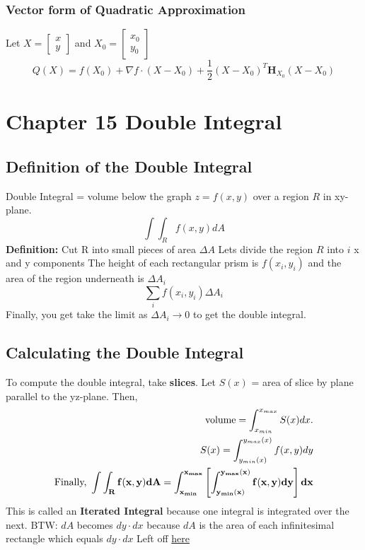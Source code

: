 \documentclass[12pt]{article}
\theoremstyle{break}
\numberwithin{theorem}{subsection}
\numberwithin{lemma}{subsection}
\numberwithin{corollary}{subsection}
\numberwithin{equation}{subsection}
\newcommand{\vect}[1]{\boldsymbol{#1}}
\begin{document}
\subsubsection{Vector form of Quadratic Approximation}
Let $X = \begin{bmatrix} x \\ y \end{bmatrix} $ and $X_0 = \begin{bmatrix} x_0 \\ y_0 \end{bmatrix} $
\begin{equation*}
	Q(X) = f(X_0) + \nabla f \cdot (X - X_0) + \frac12 (X - X_0)^T \vect{H}_{X_0} (X - X_0)
\end{equation*}


\section{Chapter 15 Double Integral}

\subsection{Definition of the Double Integral}
Double Integral = volume below the graph $z = f(x,y)$ over a region $R$ in xy-plane.
\begin{equation*}
	\int \int_R f(x,y)dA
\end{equation*}
\textbf{Definition: } Cut R into small pieces of area $\Delta A$
Lets divide the region $R$ into $i$ x and y components
The height of each rectangular prism is $f(x_i, y_i)$ and the area of the region underneath is $\Delta A_i$
\begin{equation*}
	\sum_i f(x_i,y_i) \Delta A_i 
\end{equation*}
Finally, you get take the limit as $\Delta A_i \to 0$ to get the double integral.

\subsection{Calculating the Double Integral}
To compute the double integral, take \textbf{slices}. 
Let $S(x)$ = area of slice by plane parallel to the yz-plane.
Then, 
\begin{align*}
	\text{volume} = \int_{x_{min}}^{x_{max}} S(x)dx. \\
	S(x) = \int_{y_{min}(x)}^{y_{max}(x)} f(x,y)dy \\
	{\bf \text{Finally, } \int \int_R f(x,y) dA = \int_{x_{min}}^{x_{max}} \left[ \int_{y_{min}(x)}^{y_{max}(x)} f(x,y) dy \right] dx}
\end{align*}
This is called an \textbf{Iterated Integral} because one integral is integrated over the next.
BTW: $dA$ becomes $dy \cdot dx$ because $dA$ is the area of each infinitesimal rectangle which equals $dy \cdot dx$
\newline Left off \href{https://youtu.be/YP_B0AapU0c?t=2148}{here}
\end{document}
